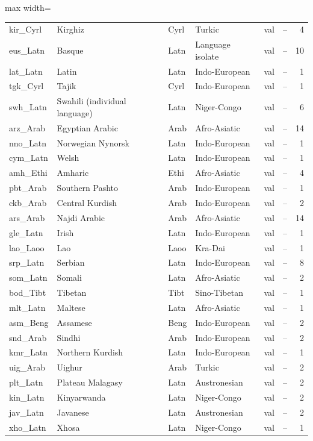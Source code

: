 \begin{table}[p]
\begin{minipage}[t]{0.49\textwidth}
\begin{adjustbox}{max width=\linewidth}
\begin{tabular}[t]{llllrrr}
kir\_Cyrl & Kirghiz & Cyrl & Turkic & val & -- & 4 \\
eus\_Latn & Basque & Latn & Language isolate & val & -- & 10 \\
lat\_Latn & Latin & Latn & Indo-European & val & -- & 1 \\
tgk\_Cyrl & Tajik & Cyrl & Indo-European & val & -- & 1 \\
swh\_Latn & Swahili (individual language) & Latn & Niger-Congo & val & -- & 6 \\
arz\_Arab & Egyptian Arabic & Arab & Afro-Asiatic & val & -- & 14 \\
nno\_Latn & Norwegian Nynorsk & Latn & Indo-European & val & -- & 1 \\
cym\_Latn & Welsh & Latn & Indo-European & val & -- & 1 \\
amh\_Ethi & Amharic & Ethi & Afro-Asiatic & val & -- & 4 \\
pbt\_Arab & Southern Pashto & Arab & Indo-European & val & -- & 1 \\
ckb\_Arab & Central Kurdish & Arab & Indo-European & val & -- & 2 \\
ars\_Arab & Najdi Arabic & Arab & Afro-Asiatic & val & -- & 14 \\
gle\_Latn & Irish & Latn & Indo-European & val & -- & 1 \\
lao\_Laoo & Lao & Laoo & Kra-Dai & val & -- & 1 \\
srp\_Latn & Serbian & Latn & Indo-European & val & -- & 8 \\
som\_Latn & Somali & Latn & Afro-Asiatic & val & -- & 2 \\
bod\_Tibt & Tibetan & Tibt & Sino-Tibetan & val & -- & 1 \\
mlt\_Latn & Maltese & Latn & Afro-Asiatic & val & -- & 1 \\
asm\_Beng & Assamese & Beng & Indo-European & val & -- & 2 \\
snd\_Arab & Sindhi & Arab & Indo-European & val & -- & 2 \\
kmr\_Latn & Northern Kurdish & Latn & Indo-European & val & -- & 1 \\
uig\_Arab & Uighur & Arab & Turkic & val & -- & 2 \\
plt\_Latn & Plateau Malagasy & Latn & Austronesian & val & -- & 2 \\
kin\_Latn & Kinyarwanda & Latn & Niger-Congo & val & -- & 2 \\
jav\_Latn & Javanese & Latn & Austronesian & val & -- & 2 \\
xho\_Latn & Xhosa & Latn & Niger-Congo & val & -- & 1 \\

\end{tabular}
\end{adjustbox}
\end{minipage}
\end{table}
